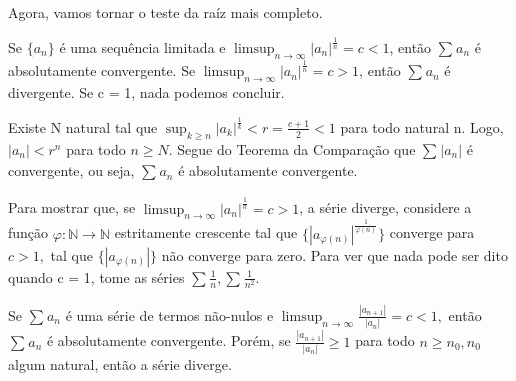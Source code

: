 \documentclass[analysis_notes.tex]{subfiles}
\begin{document}
Agora, vamos tornar o teste da ra\'iz mais completo.
\begin{theorem*}
	Se $\{a_{n}\}$ \'e uma sequ\^encia limitada e $\limsup_{n\to\infty}|a_{n}|^{\frac{1}{n}} = c < 1$, ent\~ao $\sum\limits_{}^{}a_{n}$
	\'e absolutamente convergente. Se $\limsup_{n\to\infty}|a_{n}|^{\frac{1}{n}} = c > 1$, ent\~ao $\sum\limits_{}^{}a_{n}$ \'e divergente.
	Se c = 1, nada podemos concluir.
\end{theorem*}
\begin{proof*}
	Existe N natural tal que $\sup_{k\geq{n}}|a_{k}|^{\frac{1}{k}} < r = \frac{c+1}{2} < 1$ para todo natural n. Logo, $|a_{n}|<r^{n}$ para
	todo $n\geq{N}.$ Segue do Teorema da Compara\c c\~ao que $\sum\limits_{}^{}|a_{n}|$ \'e convergente, ou seja, $\sum\limits_{}^{}a_{n}$ \'e absolutamente convergente. \qedsymbol

	Para mostrar que, se $\limsup_{n\to\infty}|a_{n}|^{\frac{1}{n}} = c > 1$, a s\'erie diverge, considere a fun\c c\~ao $\varphi:\mathbb{N}\rightarrow \mathbb{N}$
	estritamente crescente tal que $\{|a_{\varphi(n)}|^{\frac{1}{\varphi(n)}}\}$ converge para $c>1,$ tal que $\{|a_{\varphi(n)}|\}$
	n\~ao converge para zero. Para ver que nada pode ser dito quando c = 1, tome as s\'eries $\sum\limits_{}^{}\frac{1}{n}, \sum\limits_{}^{}\frac{1}{n^{2}}.$
\end{proof*}
\begin{theorem*}
	Se $\sum\limits_{}^{}a_{n}$ \'e uma s\'erie de termos n\~ao-nulos e $\limsup_{n\to\infty}\frac{|a_{n+1}|}{|a_{n}|} = c < 1,$ ent\~ao
	$\sum\limits_{}^{}a_{n}$ \'e absolutamente convergente. Por\'em, se $\frac{|a_{n+1}|}{|a_{n}|}\geq{1}$ para todo $n\geq{n_{0}}, n_{0}$ algum natural,
	ent\~ao a s\'erie diverge.
\end{theorem*}
\end{document}
